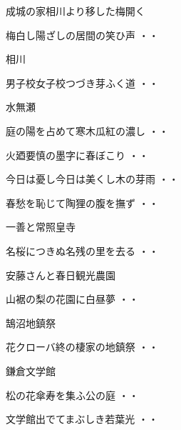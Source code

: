 \vspace{0.6cm}
成城の家相川より移した梅開く
\begin{shiika}梅白し陽ざしの居間の笑ひ声
\hfill{・・}\end{shiika}
\vspace{0.6cm}
相川
\begin{shiika}男子校女子校つづき芽ふく道
\hfill{・・}\end{shiika}
\vspace{0.6cm}
水無瀬
\begin{shiika}庭の陽を占めて寒木瓜紅の濃し
\hfill{・・}\end{shiika}
\begin{shiika}火廼要慎の墨字に春ぼこり
\hfill{・・}\end{shiika}
\begin{shiika}今日は憂し今日は美くし木の芽雨
\hfill{・・}\end{shiika}
\begin{shiika}春愁を恥じて陶狸の腹を撫ず
\hfill{・・}\end{shiika}
\vspace{0.6cm}
一善と常照皇寺
\begin{shiika}名桜につきぬ名残の里を去る
\hfill{・・}\end{shiika}
\vspace{0.6cm}
安藤さんと春日観光農園
\begin{shiika}山裾の梨の花園に白昼夢
\hfill{・・}\end{shiika}
\vspace{0.6cm}
鵠沼地鎮祭
\begin{shiika}花クローバ終の棲家の地鎮祭
\hfill{・・}\end{shiika}
\vspace{0.6cm}
鎌倉文学館
\begin{shiika}松の花傘寿を集ふ公の庭
\hfill{・・}\end{shiika}
\begin{shiika}文学館出でてまぶしき若葉光
\hfill{・・}\end{shiika}
\vspace{0.6cm}
